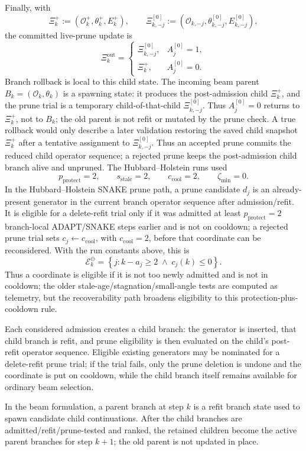 \documentclass[
  reprint,
  amsmath,
  amssymb,
  aps,
  pra,
  nofootinbib,
  superscriptaddress,
  floatfix
]{revtex4-2}
\begin{document}
Finally, with
\[
\Xi_k^+:=(\mathcal O_k^+,\theta_k^+,E_k^+),
\qquad
\Xi_{k,-j}^{[0]}
:=
(\mathcal O_{k,-j},\theta_{k,-j}^{[0]},E_{k,-j}^{[0]}),
\]
the committed live-prune update is
\[
\Xi_k^{\mathrm{out}}
=
\begin{cases}
\Xi_{k,-j}^{[0]}, & A_j^{[0]}=1,\\
\Xi_k^+, & A_j^{[0]}=0.
\end{cases}
\]
Branch rollback is local to this child state.  The incoming beam parent
\(B_k=(\mathcal O_k,\theta_k)\) is a spawning state: it produces the
post-admission child \(\Xi_k^+\), and the prune trial is a temporary
child-of-that-child \(\Xi_{k,-j}^{[0]}\).  Thus \(A_j^{[0]}=0\) returns to
\(\Xi_k^+\), not to \(B_k\); the old parent is not refit or mutated by the
prune check.  A true rollback would only describe a later validation restoring
the saved child snapshot \(\Xi_k^+\) after a tentative assignment to
\(\Xi_{k,-j}^{[0]}\).  Thus an accepted prune commits the reduced child
operator sequence; a rejected prune keeps the post-admission child branch alive
and unpruned.
The Hubbard--Holstein runs used
\[
p_{\mathrm{protect}}=2,\qquad
s_{\mathrm{stale}}=2,\qquad
c_{\mathrm{cool}}=2,\qquad
\zeta_{\min}=0 .
\]
In the Hubbard--Holstein SNAKE prune path, a prune candidate \(d_j\) is an already-present generator in the current branch operator sequence after admission/refit.  It is eligible for a delete-refit trial only if it was admitted at least \(p_{\mathrm{protect}}=2\) branch-local ADAPT/SNAKE steps earlier and is not on cooldown; a rejected prune trial sets \(c_j\leftarrow c_{\mathrm{cool}}\), with \(c_{\mathrm{cool}}=2\), before that coordinate can be reconsidered.  With the run constants above, this is
\[
\mathcal E_k^{\ominus}
=
\left\{
j:
k-a_j\ge 2
\;\land\;
c_j(k)\le 0
\right\}.
\]
Thus a coordinate is eligible if it is not too newly admitted and is not in cooldown; the older stale-age/stagnation/small-angle tests are computed as telemetry, but the recoverability path broadens eligibility to this protection-plus-cooldown rule.

Each considered admission creates a child branch: the generator is inserted, that child branch is refit, and prune eligibility is then evaluated on the child's post-refit operator sequence.  Eligible existing generators may be nominated for a delete-refit prune trial; if the trial fails, only the prune deletion is undone and the coordinate is put on cooldown, while the child branch itself remains available for ordinary beam selection.

In the beam formulation, a parent branch at step \(k\) is a refit branch state used to spawn candidate child continuations.  After the child branches are admitted/refit/prune-tested and ranked, the retained children become the active parent branches for step \(k+1\); the old parent is not updated in place.
\end{document}
